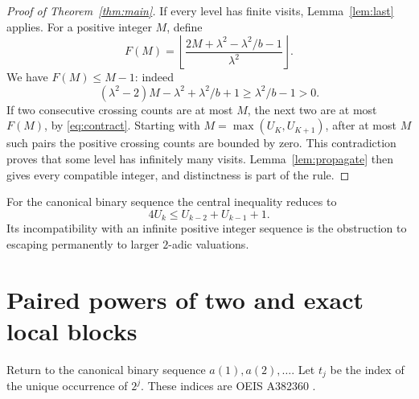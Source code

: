 \documentclass[10pt]{article}
\begin{document}
\begin{proof}[Proof of Theorem~\ref{thm:main}]
If every level has finite visits, Lemma~\ref{lem:last} applies.
For a positive integer $M$, define
\[
 F(M)=\left\lfloor
 \frac{2M+\lambda^2-\lambda^2/b-1}{\lambda^2}\right\rfloor.
\]
We have $F(M)\le M-1$: indeed
\[
 (\lambda^2-2)M-\lambda^2+\lambda^2/b+1
 \ge\lambda^2/b-1>0.
\]
If two consecutive crossing counts are at most $M$, the next two are
at most $F(M)$, by \eqref{eq:contract}. Starting with
$M=\max(U_K,U_{K+1})$, after at most $M$ such pairs the positive
crossing counts are bounded by zero. This contradiction proves that
some level has infinitely many visits. Lemma~\ref{lem:propagate} then
gives every compatible integer, and distinctness is part of the rule.
\end{proof}

For the canonical binary sequence the central inequality reduces to
\[
 4U_k\le U_{k-2}+U_{k-1}+1.
\]
Its incompatibility with an infinite positive integer sequence is the
obstruction to escaping permanently to larger $2$-adic valuations.

\section{Paired powers of two and exact local blocks}
Return to the canonical binary sequence $a(1),a(2),\ldots$.
Let $t_j$ be the index of the unique occurrence of $2^j$. These indices
are OEIS A382360 \cite{a382360}.
\end{document}
